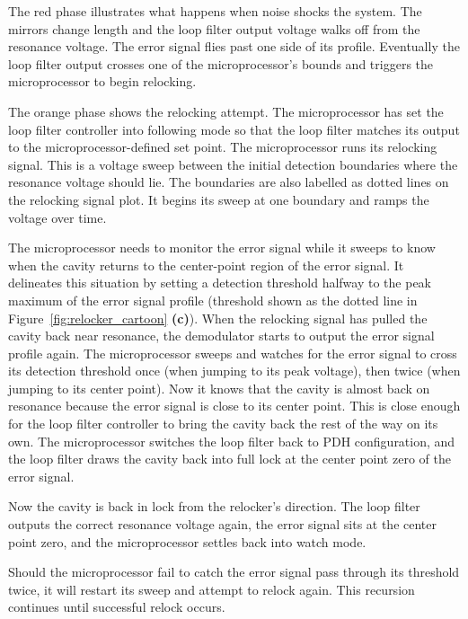 \documentclass[10pt]{report}
\begin{document}
The red phase illustrates what happens when noise shocks the system. The mirrors change length and the loop filter output voltage walks off from the resonance voltage. The error signal flies past one side of its profile. Eventually the loop filter output crosses one of the microprocessor's bounds and triggers the microprocessor to begin relocking.

The orange phase shows the relocking attempt. The microprocessor has set the loop filter controller into following mode so that the loop filter matches its output to the microprocessor-defined set point. The microprocessor runs its relocking signal. This is a voltage sweep between the initial detection boundaries where the resonance voltage should lie. The boundaries are also labelled as dotted lines on the relocking signal plot. It begins its sweep at one boundary and ramps the voltage over time.

The microprocessor needs to monitor the error signal while it sweeps to know when the cavity returns to the center-point region of the error signal. It delineates this situation by setting a detection threshold halfway to the peak maximum of the error signal profile (threshold shown as the dotted line in Figure~\ref{fig:relocker_cartoon} \textbf{(c)}). When the relocking signal has pulled the cavity back near resonance, the demodulator starts to output the error signal profile again. The microprocessor sweeps and watches for the error signal to cross its detection threshold once (when jumping to its peak voltage), then twice (when jumping to its center point). Now it knows that the cavity is almost back on resonance because the error signal is close to its center point. This is close enough for the loop filter controller to bring the cavity back the rest of the way on its own. The microprocessor switches the loop filter back to PDH configuration, and the loop filter draws the cavity back into full lock at the center point zero of the error signal.

Now the cavity is back in lock from the relocker's direction. The loop filter outputs the correct resonance voltage again, the error signal sits at the center point zero, and the microprocessor settles back into watch mode.

Should the microprocessor fail to catch the error signal pass through its threshold twice, it will restart its sweep and attempt to relock again. This recursion continues until successful relock occurs.

\end{document}
